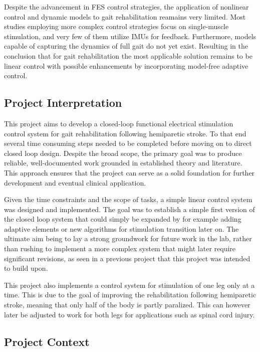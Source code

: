 Despite the advancement in FES control strategies, the application of nonlinear control and dynamic models to gait rehabilitation reamains very limited. Most studies employing more complex control strategies focus on single-muscle stimulation, and very few of them utilize IMUs for feedback. Furthermore, models capable of capturing the dynamics of full gait do not yet exist. Resulting in the conclusion that for gait rehabilitation the most applicable solution remains to be linear control with possible enhancements by incorporating model-free adaptive control.

\subsection{Project Interpretation}
This project aims to develop a closed-loop functional electrical stimulation control system for gait rehabilitation following hemiparetic stroke. To that end several time consuming steps needed to be completed before moving on to direct closed loop design. Despite the broad scope, the primary goal was to produce reliable, well-documented work grounded in established theory and literature. This approach ensures that the project can serve as a solid foundation for further development and eventual clinical application.

Given the time constraints and the scope of tasks, a simple linear control system was designed and implemented. The goal was to establish a simple first version of the closed loop system that could simply be expanded by for example adding adaptive elements or new algorithms for stimulation transition later on. The ultimate aim being to lay a strong groundwork for future work in the lab, rather than rushing to implement a more complex system that might later require significant revisions, as seen in a previous project that this project was intended to build upon.

This project also implements a control system for stimulation of one leg only at a time. This is due to the goal of improving the rehabilitation following hemiparetic stroke, meaning that only half of the body is partly paralized. This can however later be adjusted to work for both legs for applications such as spinal cord injury.



\subsection{Project Context}

